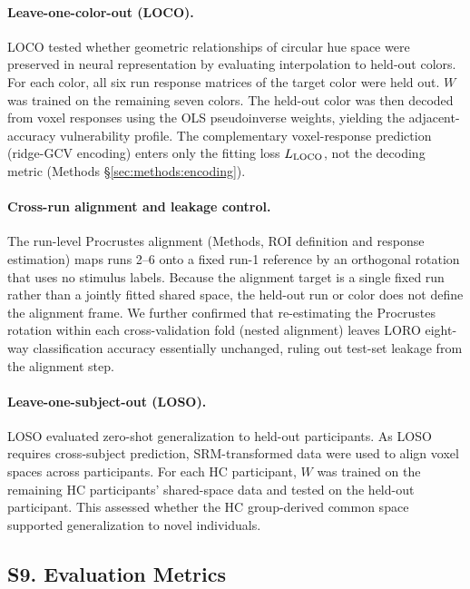 \paragraph{Leave-one-color-out (LOCO).}

LOCO tested whether geometric relationships of circular hue space were preserved in neural representation by evaluating interpolation to held-out colors.
For each color, all six run response matrices of the target color were held out. $W$ was trained on the remaining seven colors. The held-out color was then decoded from voxel responses using the OLS pseudoinverse weights, yielding the adjacent-accuracy vulnerability profile. The complementary voxel-response prediction (ridge-GCV encoding) enters only the fitting loss $L_{\rm LOCO}$, not the decoding metric (Methods \S\ref{sec:methods:encoding}).

\paragraph{Cross-run alignment and leakage control.}

The run-level Procrustes alignment (Methods, ROI definition and response estimation) maps runs 2--6 onto a fixed run-1 reference by an orthogonal rotation that uses no stimulus labels. Because the alignment target is a single fixed run rather than a jointly fitted shared space, the held-out run or color does not define the alignment frame. We further confirmed that re-estimating the Procrustes rotation within each cross-validation fold (nested alignment) leaves LORO eight-way classification accuracy essentially unchanged, ruling out test-set leakage from the alignment step.

\paragraph{Leave-one-subject-out (LOSO).}

LOSO evaluated zero-shot generalization to held-out participants.
As LOSO requires cross-subject prediction, SRM-transformed data were used to align voxel spaces across participants.
For each HC participant, $W$ was trained on the remaining HC participants' shared-space data and tested on the held-out participant.
This assessed whether the HC group-derived common space supported generalization to novel individuals.



\subsection*{\textbf{S9. Evaluation Metrics}}

